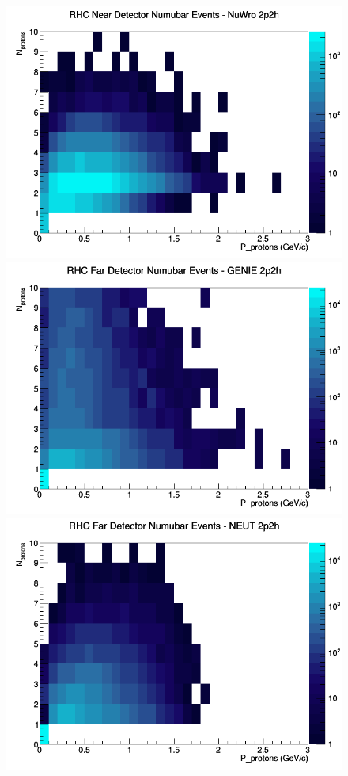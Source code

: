 \begin{figure}[h]
\includegraphics[width=\linewidth]{N_P/nominal/protons/2p2h_RHC_ND_numubar_N_P_NuWro.png}
\endminipage
\newline
{}
\includegraphics[width=\linewidth]{N_P/nominal/protons/2p2h_RHC_FD_numubar_N_P_GENIE.png}
\endminipage
{}
\includegraphics[width=\linewidth]{N_P/nominal/protons/2p2h_RHC_FD_numubar_N_P_NEUT.png}

\end{figure}
